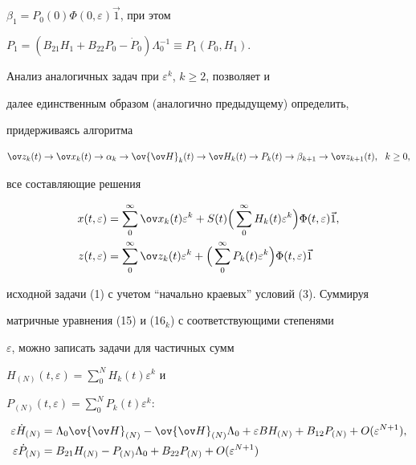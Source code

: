 $\beta_1=P_0(0)\Phi(0,\varepsilon)\Vec 1$, при этом 


$P_1=(B_{21}H_1+B_{22}P_0-\Dot P_0)\Lambda^{-1}_0 \equiv P_1(P_0,H_1)$. 


 


Анализ аналогичных задач при $\varepsilon^k$, $k\ge2$, позволяет и 


далее единственным образом (аналогично предыдущему) определить, 


придерживаясь алгоритма 


$$ 


\ov z_k(t)\to \ov x_k(t)\to\alpha_k \to\ov{\ov H}_k(t) 


\to\ov H_k(t)\to P_k(t)\to \beta_{k+1} 


\to\ov z_{k+1}(t),\ \ k\ge0, 


$$ 


все составляющие решения 


\begin{align*} 


x(t,\varepsilon)&=\sum^\infty_0 \ov x_k(t)\varepsilon^k+ 


S(t)\Big(\sum^\infty_0 H_k(t)\varepsilon^k\Big) 


\Phi(t,\varepsilon)\Vec 1, \\ 


% 


z(t,\varepsilon)&=\sum^\infty_0 \ov z_k(t)\varepsilon^k+ 


\Big(\sum^\infty_0 P_k(t)\varepsilon^k\Big) 


\Phi(t,\varepsilon)\Vec 1 


\end{align*} 


исходной задачи (1) с учетом ``начально краевых'' условий (3). Суммируя 


матричные уравнения (15) и (16$_k$) с соответствующими степенями 


$\varepsilon$, можно записать задачи для частичных сумм 


$H_{(N)}(t,\varepsilon)=\sum\limits^N_0 H_k(t)\varepsilon^k$ и 


$P_{(N)}(t,\varepsilon)=\sum\limits^N_0 P_k(t)\varepsilon^k$: 


\addtocounter{equation}{2}


\begin{equation} 


\begin{split} 


\varepsilon\Dot H_{(N)}&=\Lambda_0\ov{\ov H}_{(N)}- 


\ov{\ov H}_{(N)}\Lambda_0+\varepsilon B H_{(N)}+ 


B_{12}P_{(N)}+O(\varepsilon^{N+1}),\\ 


% 


\varepsilon\Dot P_{(N)}&=B_{21}H_{(N)}-P_{(N)}\Lambda_0 


+B_{22}P_{(N)}+O(\varepsilon^{N+1}) 


\end{split} 


\end{equation} 


